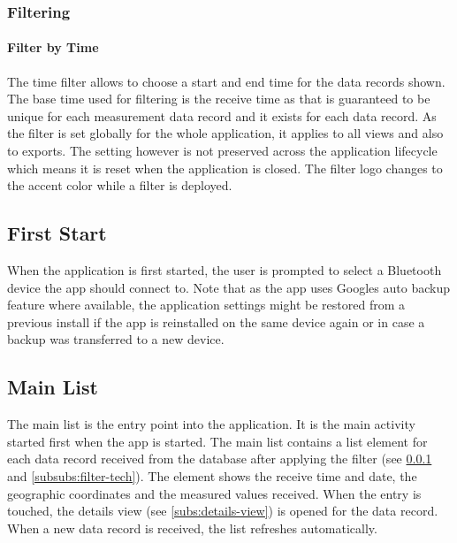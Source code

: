 \subsubsection{Filtering}
\label{subs:filter-ui}
\paragraph{Filter by Time}
The time filter allows to choose a start and end time for the data records shown. The base time used for filtering is the receive time as that is guaranteed to be unique for each measurement data record and it exists for each data record. As the filter is set globally for the whole application, it applies to all views and also to exports. The setting however is not preserved across the application lifecycle which means it is reset when the application is closed. The filter logo changes to the accent color while a filter is deployed.

\subsection{First Start}
When the application is first started, the user is prompted to select a Bluetooth device the app should connect to. Note that as the app uses Googles auto backup feature where available, the application settings might be restored from a previous install if the app is reinstalled on the same device again or in case a backup was transferred to a new device. 

\subsection{Main List}
The main list is the entry point into the application. It is the main activity started first when the app is started. The main list contains a list element for each data record received from the database after applying the filter (see \ref{subs:filter-ui} and \ref{subsubs:filter-tech}). The element shows the receive time and date, the geographic coordinates and the measured values received. When the entry is touched, the details view (see \ref{subs:details-view}) is opened for the data record. When a new data record is received, the list refreshes automatically.

